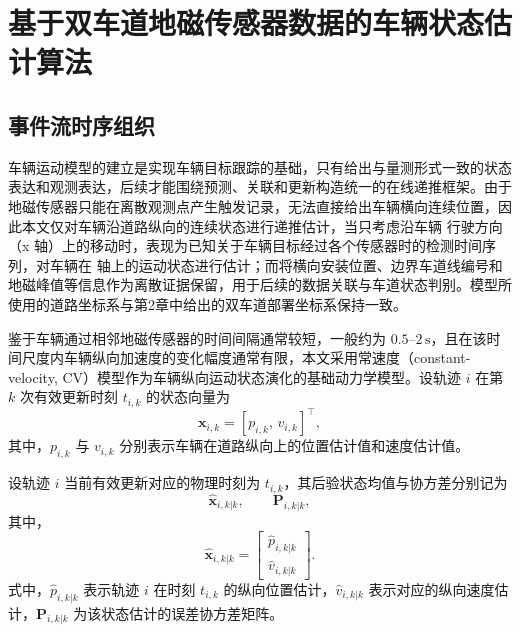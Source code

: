 \documentclass{xdupgthesis}
\begin{document}
\section{基于双车道地磁传感器数据的车辆状态估计算法}
\label{sec:ch3_state_estimation}



\subsection{事件流时序组织}

车辆运动模型的建立是实现车辆目标跟踪的基础，只有给出与量测形式一致的状态表达和观测表达，后续才能围绕预测、关联和更新构造统一的在线递推框架。由于地磁传感器只能在离散观测点产生触发记录，无法直接给出车辆横向连续位置，因此本文仅对车辆沿道路纵向的连续状态进行递推估计，当只考虑沿车辆 行驶方向（x 轴）上的移动时，表现为已知关于车辆目标经过各个传感器时的检测时间序列，对车辆在 轴上的运动状态进行估计；而将横向安装位置、边界车道线编号和地磁峰值等信息作为离散证据保留，用于后续的数据关联与车道状态判别。模型所使用的道路坐标系与第2章中给出的双车道部署坐标系保持一致。

鉴于车辆通过相邻地磁传感器的时间间隔通常较短，一般约为 $0.5$--$2\,\mathrm{s}$，且在该时间尺度内车辆纵向加速度的变化幅度通常有限，本文采用常速度（constant-velocity, CV）模型作为车辆纵向运动状态演化的基础动力学模型。设轨迹 $i$ 在第 $k$ 次有效更新时刻 $t_{i,k}$ 的状态向量为
\begin{equation}
	\mathbf{x}_{i,k} = \left[p_{i,k},\, v_{i,k}\right]^{\top},
\end{equation}
其中，$p_{i,k}$ 与 $v_{i,k}$ 分别表示车辆在道路纵向上的位置估计值和速度估计值。


设轨迹 $i$ 当前有效更新对应的物理时刻为 $t_{i,k}$，其后验状态均值与协方差分别记为
\begin{equation}
	\hat{\mathbf x}_{i,k|k},
	\qquad
	\mathbf P_{i,k|k},
	\label{eq:ch3_post_state}
\end{equation}
其中，
\begin{equation}
	\hat{\mathbf x}_{i,k|k}=
	\begin{bmatrix}
		\hat p_{i,k|k}\\
		\hat v_{i,k|k}
	\end{bmatrix}.
	\label{eq:ch3_post_state_vec}
\end{equation}
式中，$\hat p_{i,k|k}$ 表示轨迹 $i$ 在时刻 $t_{i,k}$ 的纵向位置估计，$\hat v_{i,k|k}$ 表示对应的纵向速度估计，$\mathbf P_{i,k|k}$ 为该状态估计的误差协方差矩阵。
\end{document}
